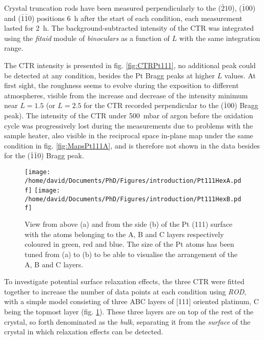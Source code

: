 Crystal truncation rods have been measured perpendicularly to the ($\bar{2}10$), ($\bar{1}00$) and ($\bar{1}\bar{1}0$) positions \qty{6}{\hour} after the start of each condition, each measurement lasted for \qty{2}{\hour}.
The background-subtracted intensity of the CTR was integrated using the \textit{fitaid} module of \textit{binoculars} as a function of $L$ with the same integration range.

The CTR intensity is presented in fig. \ref{fig:CTRPt111}, no additional peak could be detected at any condition, besides the Pt Bragg peaks at higher $L$ values.
At first sight, the roughness seems to evolve during the exposition to different atmospheres, visible from the increase and decrease of the  intensity minimum near $L=1.5$ (or $L=2.5$ for the CTR recorded perpendicular to the ($\bar{1}$00) Bragg peak).
The intensity of the CTR under \qty{500}{\milli\bar} of argon before the oxidation cycle was progressively lost during the measurements due to problems with the sample heater, also visible in the reciprocal space in-plane map under the same condition in fig. \ref{fig:MapsPt111A}, and is therefore not shown in the data besides for the ($\bar{1}\bar{1}$0) Bragg peak.

\begin{figure}[!htb]
    \centering
    \texttt{[image: /home/david/Documents/PhD/Figures/introduction/Pt111HexA.pdf]}
    \texttt{[image: /home/david/Documents/PhD/Figures/introduction/Pt111HexB.pdf]}
    \caption{
        View from above (a) and from the side (b) of the Pt (111) surface with the atoms belonging to the A, B and C layers respectively coloured in green, red and blue.
        The size of the Pt atoms has been tuned from (a) to (b) to be able to visualise the arrangement of the A, B and C layers.
    }
    \label{fig:Pt111StructureSideAndTop}
\end{figure}

To investigate potential surface relaxation effects, the three CTR were fitted together to increase the number of data points at each condition using \textit{ROD}, with a simple model consisting of three ABC layers of [111] oriented platinum, C being the topmost layer (fig. \ref{fig:Pt111StructureSideAndTop}).
These three layers are on top of the rest of the crystal, so forth denominated as the \textit{bulk}, separating it from the \textit{surface} of the crystal in which relaxation effects can be detected.

